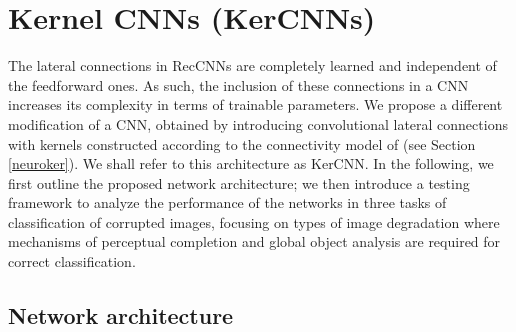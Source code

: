 \documentclass[11pt,oneside,reqno]{amsart}
\begin{document}
 
 
 \section{Kernel CNNs (KerCNNs)}
 
 The lateral connections in RecCNNs are completely learned and independent of the feedforward ones. As such, the inclusion of these connections in a CNN increases its complexity in terms of trainable parameters. We propose a different modification of a CNN, obtained by introducing convolutional lateral connections with kernels constructed according to the connectivity model of \citet{neuro,metric} (see Section \ref{neuroker}). We shall refer to this architecture as KerCNN. In the following, we first outline the proposed network architecture; we then introduce a testing framework to analyze the performance of the networks in three tasks of classification of corrupted images, focusing on types of image degradation where mechanisms of perceptual completion and global object analysis are required for correct classification.
 
 \subsection{Network architecture}\label{archi}
 
\end{document}
